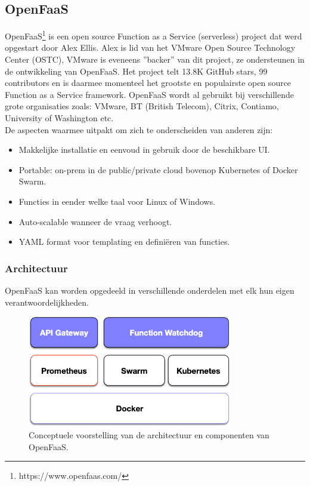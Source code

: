 \subsection{OpenFaaS}
OpenFaaS\footnote{https://www.openfaas.com/} is een open source Function as a Service (serverless) project dat werd opgestart door Alex Ellis. Alex is lid van het VMware Open Source Technology Center (OSTC), VMware is eveneens ''backer'' van dit project, ze ondersteunen in de ontwikkeling van OpenFaaS. Het project telt 13.8K GitHub stars, 99 contributors en is daarmee momenteel het grootste en populairste open source Function as a Service framework. OpenFaaS wordt al gebruikt bij verschillende grote organisaties zoals: VMware, BT (British Telecom), Citrix, Contiamo, University of Washington etc.
\\
De aspecten waarmee \textcite{OpenFaaS2019} uitpakt om zich te onderscheiden van anderen zijn:
\begin{itemize}
    \item Makkelijke installatie en eenvoud in gebruik door de beschikbare UI.
    \item Portable: on-prem in de public/private cloud  bovenop Kubernetes of Docker Swarm.
    \item Functies in eender welke taal voor Linux of Windows.
    \item Auto-scalable wanneer de vraag verhoogt.
    \item YAML format voor templating en definiëren van functies.
\end{itemize}

\subsubsection{Architectuur}
OpenFaaS kan worden opgedeeld in verschillende onderdelen met elk hun eigen verantwoordelijkheden.
\begin{figure}
    \centering
    \includegraphics[width=0.8\textwidth]{img/openfaas-architectuur.png}
    \caption{Conceptuele voorstelling van de architectuur en componenten van OpenFaaS.}
    \label{fig:open-faas-conceptueel}  
\end{figure}

